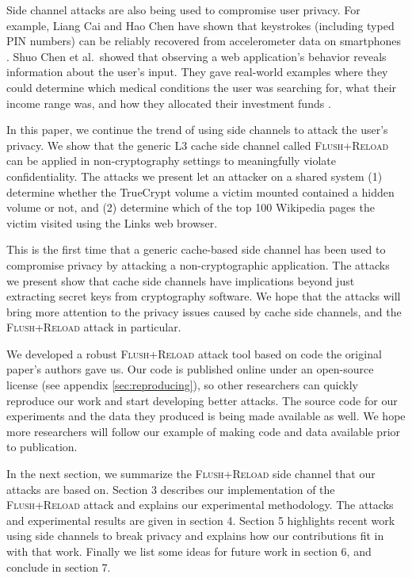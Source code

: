 \documentclass{acm_proc_article-sp}
\begin{document}
Side channel attacks are also being used to compromise user privacy. For
example, Liang Cai and Hao Chen have shown that keystrokes (including typed PIN
numbers) can be reliably recovered from accelerometer data on smartphones
\cite{cai2012practicality}. Shuo Chen et al.\ showed that observing a web
application's behavior reveals information about the user's input. They gave
real-world examples where they could determine which medical conditions the user
was searching for, what their income range was, and how they allocated their
investment funds \cite{chen2010side}.

In this paper, we continue the trend of using side channels to attack the user's
privacy. We show that the generic L3 cache side channel called \textsc{Flush+Reload}
\cite{yarom2013flush} can be applied in non-cryptography settings to
meaningfully violate confidentiality. The attacks we present let an attacker on
a shared system (1) determine whether the TrueCrypt volume a victim mounted
contained a hidden volume or not, and (2) determine which of the top 100
Wikipedia pages the victim visited using the Links web browser.

This is the first time that a generic cache-based side channel has been used to
compromise privacy by attacking a non-cryptographic application. The attacks we
present show that cache side channels have implications beyond just extracting
secret keys from cryptography software. We hope that the attacks will bring more
attention to the privacy issues caused by cache side channels, and the
\textsc{Flush+Reload} attack in particular.

We developed a robust \textsc{Flush+Reload} attack tool based on code the
original paper's authors gave us. Our code is published online under an
open-source license (see appendix \ref{sec:reproducing}), so other researchers
can quickly reproduce our work and start developing better attacks. The source
code for our experiments and the data they produced is being made available as
well. We hope more researchers will follow our example of making code and data
available prior to publication.

In the next section, we summarize the \textsc{Flush+Reload} side channel that our attacks
are based on. Section 3 describes our implementation of the \textsc{Flush+Reload} attack
and explains our experimental methodology. The attacks and experimental results
are given in section 4. Section 5 highlights recent work using side channels to
break privacy and explains how our contributions fit in with that work. Finally
we list some ideas for future work in section 6, and conclude in section 7.
\end{document}
